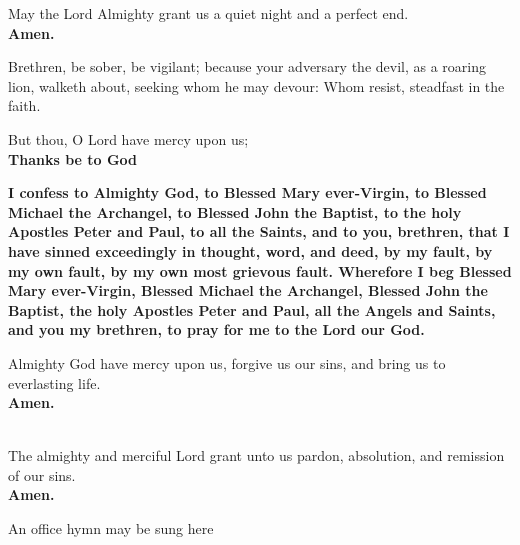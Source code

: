 
May the Lord Almighty grant us a quiet night and a perfect end.\\
\textbf{Amen.}

Brethren, be sober, be vigilant; because your adversary the devil, as a roaring lion,
walketh about, seeking whom he may devour: Whom resist, steadfast in the faith.

But thou, O Lord have mercy upon us;\\
\textbf{Thanks be to God}

\textbf{I confess to Almighty God, to Blessed Mary ever-Virgin, to Blessed Michael
the Archangel, to Blessed John the Baptist, to the holy Apostles Peter and
Paul, to all the Saints, and to you, brethren, that I have sinned exceedingly in
thought, word, and deed, by my fault, by my own fault, by my own most
grievous fault. Wherefore I beg Blessed Mary ever-Virgin, Blessed Michael
the Archangel, Blessed John the Baptist, the holy Apostles Peter and Paul, all
the Angels and Saints, and you my brethren, to pray for me to the Lord our
God.}

Almighty God have mercy upon us, forgive us our sins, and bring us to everlasting life.\\
\textbf{Amen.}

\\
The almighty and merciful Lord grant unto us pardon, absolution, and remission of our sins.\\
\textbf{Amen.}


\begin{rubric}
An office hymn may be sung here
\end{rubric}

